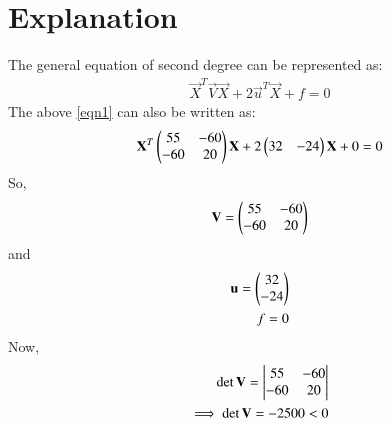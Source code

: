 \documentclass[journal,12pt,twocolumn]{IEEEtran}
\begin{document}
\section{Explanation}
The general equation of second degree can be represented as:
\begin{align}
\vec{X}^T\vec{V}\vec{X} + 2\vec{u}^T\vec{X} + f = 0
\end{align}
The above \ref{eqn1} can also be written as:
\begin{align}
\mathbf{X}^T\begin{pmatrix}55 & -60\\-60 & 20\end{pmatrix}\mathbf{X} + 2\begin{pmatrix}32 & -24\end{pmatrix}\mathbf{X} +0 = 0
\end{align}
So, 
\begin{align}
\mathbf{V} = \begin{pmatrix}55 & -60\\-60 & 20\end{pmatrix}
\end{align}
and 
\begin{align}
\mathbf{u} = \begin{pmatrix}32 \\ -24\end{pmatrix}\\
f=0
\end{align}
Now, 
\begin{align}
\det{\mathbf{V}} = \begin{vmatrix}55 & -60\\-60 & 20\end{vmatrix}\\
\implies \det{\mathbf{V}} = -2500 <0
\end{align}
\end{document}
